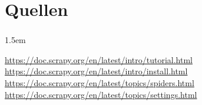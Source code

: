 \documentclass{beamer}
\begin{document}
\section{Quellen}
\begin{frame}
	\frametitle{\insertsection{}}
	\emergencystretch 1.5em
	{\small
	\begin{thebibliography}{8}
		\url{https://doc.scrapy.org/en/latest/intro/tutorial.html}
		\url{https://doc.scrapy.org/en/latest/intro/install.html}
		\url{https://doc.scrapy.org/en/latest/topics/spiders.html}
		\url{https://doc.scrapy.org/en/latest/topics/settings.html}
	\end{thebibliography}
	}
\end{frame}
\end{document}
